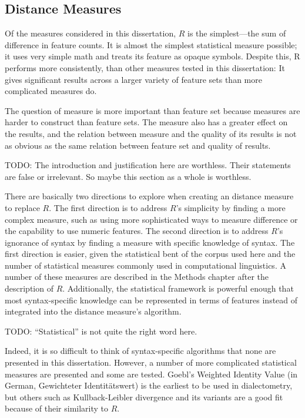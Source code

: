 \subsection{Distance Measures}

Of the measures considered in this dissertation, $R$ is the
simplest---the sum of difference in feature counts. It is almost the
simplest statistical measure possible; it uses very simple math and
treats its feature as opaque symbols.  Despite this, R performs more
consistently, than other measures tested in this
dissertation: It gives significant results across a larger variety of
feature sets than more complicated measures do.

The question of measure is more important than feature set because
measures are harder to construct than feature sets. The measure also
has a greater effect on the results, and the relation between measure
and the quality of its results is not as obvious as the same relation
between feature set and quality of results.

TODO: The introduction and justification here are worthless. Their
statements are false or irrelevant. So maybe this section as a whole
is worthless.

There are basically two directions to explore when creating an
distance measure to replace $R$. The first direction is to address
$R$'s simplicity by finding a more complex measure, such as using more
sophisticated ways to measure difference or the capability to use
numeric features. The second direction is to address $R$'s ignorance
of syntax by finding a measure with specific knowledge of syntax. The
first direction is easier, given the statistical bent of the corpus
used here and the number of statistical measures commonly used in
computational linguistics. A number of these measures are described in
the Methods chapter after the description of $R$.  Additionally, the
statistical framework is powerful enough that most syntax-specific
knowledge can be represented in terms of features instead of
integrated into the distance measure's algorithm.

TODO: ``Statistical'' is not quite the right word here.

Indeed, it is so difficult to think of syntax-specific algorithms that
none are presented in this dissertation. However, a number of more
complicated statistical measures are presented and some are tested. Goebl's
Weighted Identity Value (in German, Gewichteter Identit\"atswert) is
the earliest to be used in dialectometry, but others such as
Kullback-Leibler divergence and its variants are a good fit because of
their similarity to $R$.


